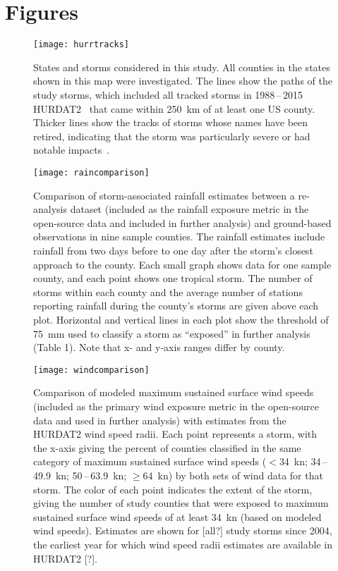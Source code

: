 \section*{Figures}

\listoffigures

\clearpage

\begin{figure}[tbhp!] \centering
\texttt{[image: hurrtracks]}
\caption{States and storms considered in this study. All counties in the states
        shown in this map were investigated. The lines show the paths
	of the study storms, which included all tracked storms in 1988\,--\,2015
	\ac{HURDAT2}~\parencite{landsea2013} that came within 250~\si{\kilo\metre} 
	of at least one \ac{US} county. Thicker lines show the tracks 
	of storms whose names have been retired, indicating that the storm was particularly 
	severe or had notable impacts~\parencite{retirednames}.
	}
\label{fig:hurrtracks}
\end{figure}

\clearpage

\begin{figure}[tbhp!] \centering
\texttt{[image: raincomparison]} 
	\caption{Comparison of storm-associated rainfall estimates between 
	a re-analysis dataset (included as the rainfall exposure metric
	in the open-source data and included in further analysis) and ground-based
	observations in nine sample counties. The rainfall estimates  
	include rainfall from two days before to one day after the storm's closest
	approach to the county. Each small graph shows data for one sample county, 
	and each point shows one tropical storm. The number of storms 
	within each county and the average number of stations reporting rainfall during 
	the county's storms are given above each plot. Horizontal and vertical lines 
	in each plot show the threshold of 75~\si{\milli\metre} used to classify a storm 
	as ``exposed'' in further analysis (Table 1). Note that 
	x- and y-axis ranges differ by county.
	} 
\label{fig:raincomparison}
\end{figure}

\begin{figure}[tbhp!]
\centering
\texttt{[image: windcomparison]}
\caption{Comparison of modeled maximum sustained surface wind speeds 
	(included as the primary wind exposure metric in the open-source
	data and used in further analysis) with estimates from the \ac{HURDAT2}
	wind speed radii. Each point represents a storm, with the x-axis
	giving the percent of counties classified in the same category
	of maximum sustained surface wind speeds ($<$34~\si{\knot}; 
	34\,--\,49.9~\si{\knot}; 50\,--\,63.9~\si{\knot}; 
	$\ge$64~\si{\knot}) by both sets of wind data for that storm. The 
	color of each point indicates the extent of the storm, 
	giving the number of study counties that were exposed to 
	maximum sustained surface wind speeds of at least 34~\si{\knot}
	(based on modeled wind speeds). Estimates are shown for [all?]
	study storms since 2004, the earliest year for which 
	wind speed radii estimates are available in \ac{HURDAT2} [?].
	}
\label{fig:windcomparison}
\end{figure}


